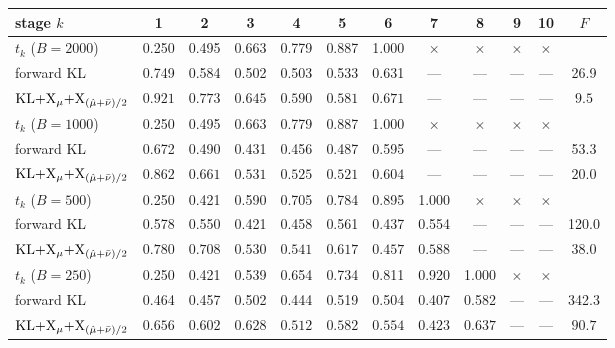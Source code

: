 \documentclass{article}
\begin{document}
\begin{table}[htb]
    \centering
    \setlength{\tabcolsep}{2.2pt}
    \begin{tabular}{@{}lccccccccccc@{}}
        \toprule
        stage $k$ & 1 & 2 & 3 & 4 & 5 & 6 & 7 & 8 & 9 & 10 & $F$ \\
        \midrule
        $t_k$ ($B=2000$) & 0.250 & 0.495 & 0.663 & 0.779 & 0.887 & 1.000 & $\times$ & $\times$ & $\times$ & $\times$ & \\
        forward KL & 0.749 & 0.584 & 0.502 & 0.503 & 0.533 & 0.631 & --- & --- & --- & --- & 26.9 \\
        $\mathrm{KL}{+}\mathrm{X}_\mu{+}\mathrm{X}_{(\hat\mu+\bar\nu)/2}$ & $\mathbf{0.921}$ & $\mathbf{0.773}$ & $\mathbf{0.645}$ & $\mathbf{0.590}$ & $\mathbf{0.581}$ & $\mathbf{0.671}$ & --- & --- & --- & --- & $\mathbf{9.5}$ \\
        \midrule
        $t_k$ ($B=1000$) & 0.250 & 0.495 & 0.663 & 0.779 & 0.887 & 1.000 & $\times$ & $\times$ & $\times$ & $\times$ & \\
        forward KL & 0.672 & 0.490 & 0.431 & 0.456 & 0.487 & 0.595 & --- & --- & --- & --- & 53.3 \\
        $\mathrm{KL}{+}\mathrm{X}_\mu{+}\mathrm{X}_{(\hat\mu+\bar\nu)/2}$ & $\mathbf{0.862}$ & $\mathbf{0.661}$ & $\mathbf{0.531}$ & $\mathbf{0.525}$ & $\mathbf{0.521}$ & $\mathbf{0.604}$ & --- & --- & --- & --- & $\mathbf{20.0}$ \\
        \midrule
        $t_k$ ($B=500$) & 0.250 & 0.421 & 0.590 & 0.705 & 0.784 & 0.895 & 1.000 & $\times$ & $\times$ & $\times$ & \\
        forward KL & 0.578 & 0.550 & 0.421 & 0.458 & 0.561 & 0.437 & 0.554 & --- & --- & --- & 120.0 \\
        $\mathrm{KL}{+}\mathrm{X}_\mu{+}\mathrm{X}_{(\hat\mu+\bar\nu)/2}$ & $\mathbf{0.780}$ & $\mathbf{0.708}$ & $\mathbf{0.530}$ & $\mathbf{0.541}$ & $\mathbf{0.617}$ & $\mathbf{0.457}$ & $\mathbf{0.588}$ & --- & --- & --- & $\mathbf{38.0}$ \\
        \midrule
        $t_k$ ($B=250$) & 0.250 & 0.421 & 0.539 & 0.654 & 0.734 & 0.811 & 0.920 & 1.000 & $\times$ & $\times$ & \\
        forward KL & 0.464 & 0.457 & 0.502 & 0.444 & 0.519 & 0.504 & 0.407 & 0.582 & --- & --- & 342.3 \\
        $\mathrm{KL}{+}\mathrm{X}_\mu{+}\mathrm{X}_{(\hat\mu+\bar\nu)/2}$ & $\mathbf{0.656}$ & $\mathbf{0.602}$ & $\mathbf{0.628}$ & $\mathbf{0.512}$ & $\mathbf{0.582}$ & $\mathbf{0.554}$ & $\mathbf{0.423}$ & $\mathbf{0.637}$ & --- & --- & $\mathbf{90.7}$ \\

\end{tabular}
\end{table}
\end{document}
